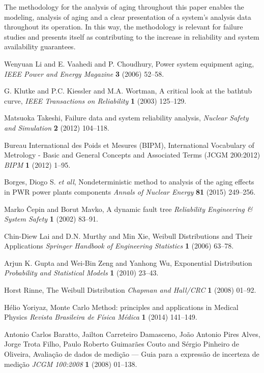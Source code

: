 \documentclass{ws-m3as}
\begin{document}
The methodology for the analysis of aging throughout this paper enables the modeling, analysis of aging and a clear presentation of a system's analysis data throughout its operation. In this way, the methodology is relevant for failure studies and presents itself as contributing to the increase in reliability and system availability guarantees.


\begin{thebibliography}{0}
	
Wenyuan Li and E. Vaahedi and P. Choudhury, Power system equipment aging, {\it IEEE Power and Energy Magazine} {\bf 3} (2006) 52--58.

G. Klutke and P.C. Kiessler and M.A. Wortman, A critical look at the bathtub curve, {\it IEEE Transactions on Reliability} {\bf 1} (2003) 125--129.

Matsuoka Takeshi, Failure data and system reliability analysis, {\it Nuclear Safety and Simulation} {\bf 2} (2012) 104--118.

Bureau International des Poids et Mesures (BIPM), International Vocabulary of Metrology -  Basic and General Concepts and Associated Terms (JCGM 200:2012) {\it BIPM} {\bf 1} (2012) 1--95.

Borges, Diogo S. {\it et all}, Nondeterministic method to analysis of the aging effects in PWR power plants components {\it Annals of Nuclear Energy} {\bf 81} (2015) 249--256.

Marko {\v{C}}epin and Borut Mavko, A dynamic fault tree {\it Reliability Engineering {\&} System Safety} {\bf 1} (2002) 83--91.

Chin-Diew Lai and D.N. Murthy and Min Xie, Weibull Distributions and Their Applications {\it Springer Handbook of Engineering Statistics} {\bf 1} (2006) 63--78.

Arjun K. Gupta and Wei-Bin Zeng and Yanhong Wu, Exponential Distribution {\it Probability and Statistical Models} {\bf 1} (2010) 23--43.

Horst Rinne, The Weibull Distribution {\it Chapman and Hall/{CRC}} {\bf 1} (2008) 01--92.

Hélio Yoriyaz, Monte Carlo Method: principles and applications in Medical Physics {\it Revista Brasileira de Física Médica} {\bf 1} (2014) 141--149.

Antonio Carlos Baratto, Jailton Carreteiro Damasceno, João Antonio Pires Alves, Jorge Trota Filho, Paulo Roberto Guimarães Couto and Sérgio Pinheiro de Oliveira, Avaliação de dados de medição — Guia para a expressão de incerteza de medição {\it JCGM 100:2008} {\bf 1} (2008) 01--138.


\end{thebibliography}
\end{document}
